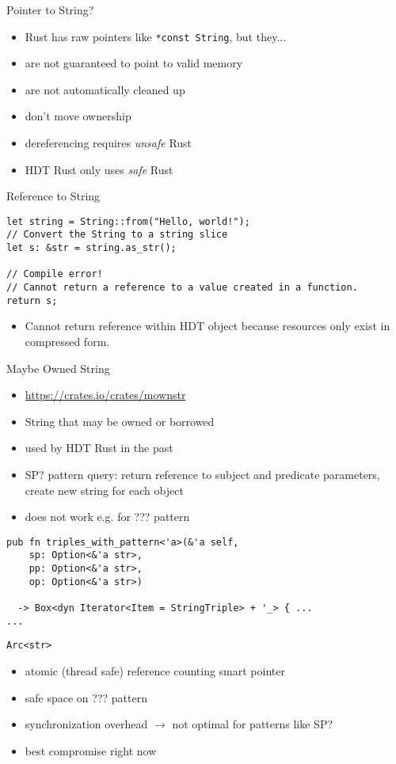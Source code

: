 \documentclass[14pt,aspectratio=169]{beamer}
\newcommand\pro{\item[$+$]}
\newcommand\con{\item[$-$]}
\begin{document}
\begin{frame}{Pointer to String?}
\begin{itemize}
\item Rust has raw pointers like \texttt{*const String}, but they...
\con are not guaranteed to point to valid memory
\con are not automatically cleaned up
\con don't move ownership
\con dereferencing requires \emph{unsafe} Rust
\item HDT Rust only uses \emph{safe} Rust
\end{itemize}
\end{frame}

\begin{frame}[fragile]{Reference to String}
\small
\begin{verbatim}
let string = String::from("Hello, world!");
// Convert the String to a string slice
let s: &str = string.as_str();

// Compile error!
// Cannot return a reference to a value created in a function.
return s;
\end{verbatim}
\begin{itemize}
\item Cannot return reference within HDT object because resources only exist in compressed form.
\end{itemize}
\end{frame}

\begin{frame}[fragile]{Maybe Owned String}
\begin{itemize}
\item \url{https://crates.io/crates/mownstr}
\item String that may be owned or borrowed
\item used by HDT Rust in the past
\pro SP? pattern query: return reference to subject and predicate parameters, create new string for each object
\con does not work e.g. for ??? pattern
\end{itemize}
\small
\begin{verbatim}
pub fn triples_with_pattern<'a>(&'a self,
    sp: Option<&'a str>,
    pp: Option<&'a str>,
    op: Option<&'a str>)

  -> Box<dyn Iterator<Item = StringTriple> + '_> { ...
...
\end{verbatim}
\end{frame}

\begin{frame}[fragile]{\texttt{Arc<str>}}
\begin{itemize}
\item atomic (thread safe) reference counting smart pointer
\pro safe space on ??? pattern
\con synchronization overhead $\rightarrow$ not optimal for patterns like SP?
\item best compromise right now
\end{itemize}
\end{frame}
\end{document}
